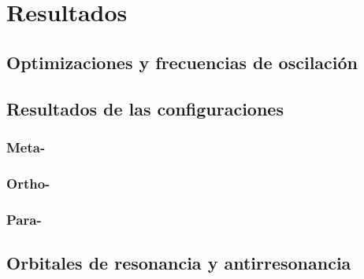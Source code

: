 
\chapter{Resultados}
    \section{Optimizaciones y frecuencias de oscilación}
    \section{Resultados de las configuraciones}
        \subsection{Meta-}
        \subsection{Ortho-}
        \subsection{Para-}
    \section{Orbitales de resonancia y antirresonancia}